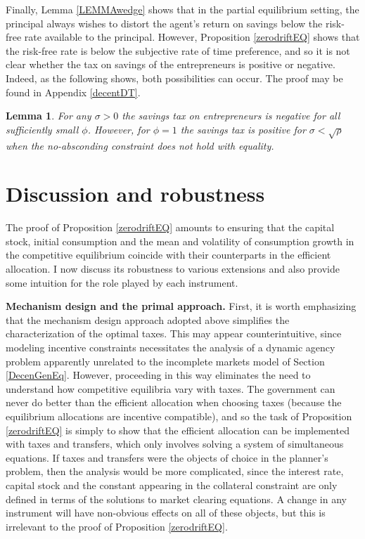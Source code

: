 \documentclass[11pt]{article}
\theoremstyle{plain}
\newtheorem{lemma}[thm]{Lemma}
\theoremstyle{definition} %
\begin{document}
Finally, Lemma \ref{LEMMAwedge} shows that in the partial equilibrium setting, the principal always wishes to distort the agent's return on savings below the risk-free rate available to the principal. However, Proposition \ref{zerodriftEQ} shows that the risk-free rate is below the subjective rate of time preference, and so it is not clear whether the tax on savings of the entrepreneurs is positive or negative. Indeed, as the following shows, both possibilities can occur. The proof may be found in Appendix \ref{decentDT}. 

\begin{lemma} \label{negS}
For any $\sigma>0$ the savings tax on entrepreneurs is negative for all sufficiently small $\phi$. However, for $\phi = 1$ the savings tax is positive for $\sigma < \sqrt{\rho}$ when the no-absconding constraint does not hold with equality.
\end{lemma}


\section{Discussion and robustness}\label{discuss}

The proof of Proposition \ref{zerodriftEQ} amounts to ensuring that the capital stock, initial consumption and the mean and volatility of consumption growth in the competitive equilibrium coincide with their counterparts in the efficient allocation. I now discuss its robustness to various extensions and also provide some intuition for the role played by each instrument.

\textbf{Mechanism design and the primal approach.} First, it is worth emphasizing that the mechanism design approach adopted above simplifies the characterization of the optimal taxes. This may appear counterintuitive, since modeling incentive constraints necessitates the analysis of a dynamic agency problem apparently unrelated to the incomplete markets model of Section \ref{DecenGenEq}. However, proceeding in this way eliminates the need to understand how competitive equilibria vary with taxes. The government can never do better than the efficient allocation when choosing taxes (because the equilibrium allocations are incentive compatible), and so the task of Proposition \ref{zerodriftEQ} is simply to show that the efficient allocation can be implemented with taxes and transfers, which only involves solving a system of simultaneous equations. If taxes and transfers were the objects of choice in the planner's problem, then the analysis would be more complicated, since the interest rate, capital stock and the constant appearing in the collateral constraint are only defined in terms of the solutions to market clearing equations. A change in any instrument will have non-obvious effects on all of these objects, but this is irrelevant to the proof of Proposition \ref{zerodriftEQ}.
\end{document}
